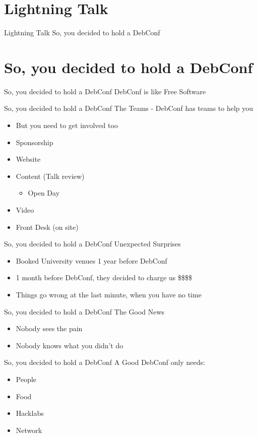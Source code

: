 
\section{Lightning Talk}

\begin{frame}{Lightning Talk}
  \Huge So, you decided to hold a DebConf
\end{frame}

\section{So, you decided to hold a DebConf}

\begin{frame}{So, you decided to hold a DebConf}
  \Huge DebConf is like Free Software
\end{frame}

\begin{frame}{So, you decided to hold a DebConf}
  \Large The Teams - DebConf has teams to help you
  \begin{itemize}
    \item<1> But you need to get involved too
    \item<1> Sponsorship
    \item<1> Website
    \item<1> Content (Talk review)
  \begin{itemize}
    \item<1> Open Day
  \end{itemize}
    \item<1> Video
    \item<1> Front Desk (on site)
  \end{itemize}
\end{frame}

\begin{frame}{So, you decided to hold a DebConf}
  \Large Unexpected Surprises
  \begin{itemize}
    \item<1> Booked University venues 1 year before DebConf
    \item<1> 1 month before DebConf, they decided to charge us \$\$\$\$
    \item<1> Things go wrong at the last minute, when you have no time
  \end{itemize}
\end{frame}

\begin{frame}{So, you decided to hold a DebConf}
  \Large The Good News
  \begin{itemize}
    \item<1> Nobody sees the pain
    \item<1> Nobody knows what you didn't do
  \end{itemize}
\end{frame}

\begin{frame}{So, you decided to hold a DebConf}
  \Large A Good DebConf only needs:
  \begin{itemize}
    \item<1> People
    \item<1> Food
    \item<1> Hacklabs
    \item<1> Network
  \end{itemize}
\end{frame}
